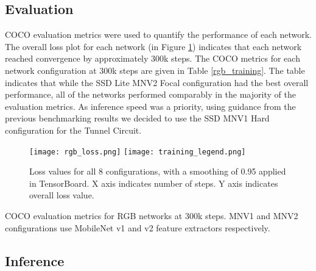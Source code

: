 \subsection{Evaluation}

COCO evaluation metrics were used to quantify the performance of each network. The overall loss plot for each network (in Figure \ref{rgb_loss}) indicates that each network reached convergence by approximately 300k steps. The COCO metrics for each network configuration at 300k steps are given in Table \ref{rgb_training}. The table indicates that while the SSD Lite MNV2 Focal configuration had the best overall performance, all of the networks performed comparably in the majority of the evaluation metrics. As inference speed was a priority, using guidance from the previous benchmarking results we decided to use the SSD MNV1 Hard configuration for the Tunnel Circuit.

\begin{figure}	
	\centering
	\texttt{[image: rgb\_loss.png]}
	\texttt{[image: training\_legend.png]}
	\caption[RGB network loss values]{Loss values for all 8 configurations, with a smoothing of 0.95 applied in TensorBoard. X axis indicates number of steps. Y axis indicates overall loss value.}
	\label{rgb_loss}
\end{figure}

\begin{table}
	\centering
	\begin{adjustbox}{max width=.95\textwidth}
	\end{adjustbox}
	\caption[COCO evaluation metrics for RGB networks at 300k steps]{COCO evaluation metrics for RGB networks at 300k steps. MNV1 and MNV2 configurations use MobileNet v1 and v2 feature extractors respectively.}
	\label{rgb_training}
\end{table}

\subsection{Inference}

